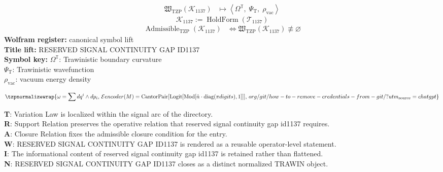 \noindent
\begin{minipage}[t]{0.48\linewidth}
\begingroup
\small
\[
\begin{aligned}
\mathfrak{W}_{\mathrm{TZP}}\!\left(\mathcal{K}_{1137}\right)
&\longmapsto
\left\langle \Omega^{\mathbb{T}},\; \Psi_{\mathrm{T}},\; \rho_{\mathrm{vac}} \right\rangle
\end{aligned}
\]
\[
\mathcal{K}_{1137}
:=
\operatorname{HoldForm}\!\left(\mathcal{T}_{1137}\right)
\]
\[
\begin{aligned}
\operatorname{Admissible}_{\mathrm{TZP}}\!\left(\mathcal{K}_{1137}\right)
&\Longleftrightarrow
\mathfrak{W}_{\mathrm{TZP}}\!\left(\mathcal{K}_{1137}\right)\not\equiv\varnothing
\end{aligned}
\]
\textbf{Wolfram register:} canonical symbol lift\\
\textbf{Title lift:} RESERVED SIGNAL CONTINUITY GAP ID1137\\
\textbf{Symbol key:} \(\Omega^{\mathbb{T}}\): Trawinistic boundary curvature\\ \(\Psi_{\mathrm{T}}\): Trawinistic wavefunction\\ \(\rho_{\mathrm{vac}}\): vacuum energy density
\par
\endgroup
\end{minipage}\hfill
\begin{minipage}[t]{0.48\linewidth}
\[
\tzpnormalizewrap{\omega = \sum dq^i \wedge dp_i,\,\mathcal{E} {encoder}(M) = \text{CantorPair}[\text{Logit}[\text{Mod}[\hat{n} \cdot \text{diag}(\pi {digits}), 1]]],\,org/git/how-to-remove-credentials-from-git/?utm_{\mathrm{source}}=chatgpt}
\]

\small
\textbf{T}: Variation Law is localized within the signal arc of the directory.\\
\textbf{R}: Support Relation preserves the operative relation that reserved signal continuity gap id1137 requires.\\
\textbf{A}: Closure Relation fixes the admissible closure condition for the entry.\\
\textbf{W}: RESERVED SIGNAL CONTINUITY GAP ID1137 is rendered as a reusable operator-level statement.\\
\textbf{I}: The informational content of reserved signal continuity gap id1137 is retained rather than flattened.\\
\textbf{N}: RESERVED SIGNAL CONTINUITY GAP ID1137 closes as a distinct normalized TRAWIN object.
\normalsize
\end{minipage}

